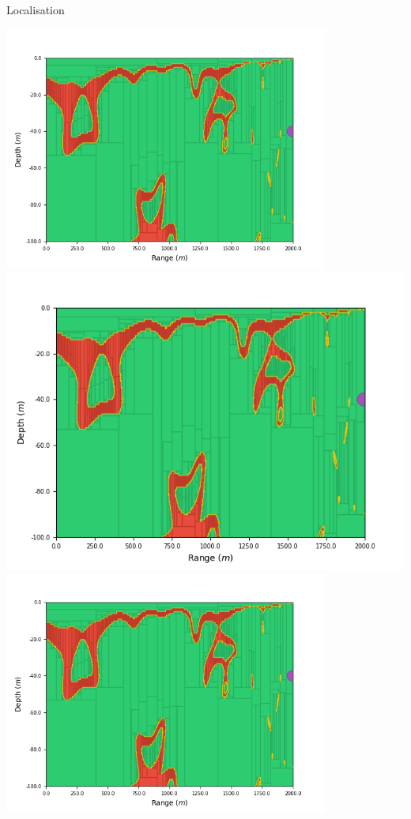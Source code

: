 \documentclass[9pt, xcolor={usenames, dvipsnames}]{beamer}
\begin{document}
\begin{frame}{Localisation}
\begin{minipage}[t][0.1\textheight][t]{\textwidth}
\begin{minipage}[t][\textheight][t]{0.325\textwidth}
\begin{overprint}
								\centering\includegraphics[width=0.8\textwidth]{images/localisation/Hydrophone_40_2000.png}
								\onslide<2>\centering\includegraphics[width=\textwidth]{images/localisation/Hydrophone_40_2000.png}
								\onslide<3>\centering\includegraphics[width=0.8\textwidth]{images/localisation/Hydrophone_40_2000.png}

\end{overprint}
\end{minipage}
\end{minipage}
\end{frame}
\end{document}
